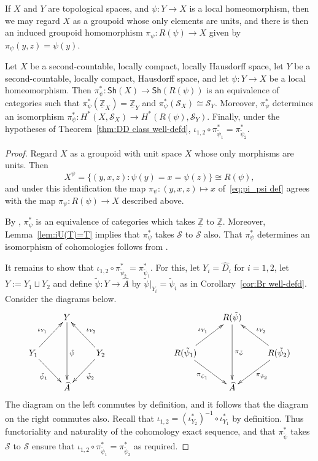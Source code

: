 \documentclass[12pt,a4paper]{amsart}
\newcommand{\field}[1]{\mathbb{#1}}
\newcommand{\ZZ}{\field{Z}}
\newcommand{\Sheaf}[1]{\mathsf{Sh}(#1)}
\newcommand{\Tgerms}{\mathcal{S}}
\begin{document}
If $X$ and $Y$ are topological spaces, and $\psi : Y \to X$ is
a local homeomorphism, then we may regard $X$ as a groupoid
whose only elements are units, and there is then an induced
groupoid homomorphism $\pi_\psi : R(\psi) \to X$ given by
$\pi_\psi(y,z) = \psi(y)$.


\begin{prop}\label{prp:Br(X)=H2(R(psi))}
Let $X$ be a second-countable, locally compact, locally
Hausdorff space, let $Y$ be a second-countable, locally compact,
Hausdorff space, and let $\psi : Y \to X$ be a local
homeomorphism. Then $\pi_\psi^* : \Sheaf{X} \to \Sheaf{R(\psi)}$
is an equivalence of categories such that
$\pi_\psi^*(\underline{\ZZ}_X) = \underline{\ZZ}_Y$ and
$\pi_\psi^*(\Tgerms_X) \cong \Tgerms_Y$. Moreover, $\pi_\psi^*$
determines an isomorphism $\pi_\psi^* : H^*(X, \Tgerms_X) \to
H^*(R(\psi),\Tgerms_Y)$. Finally, under the hypotheses of
Theorem~\ref{thm:DD class well-defd}, $\iota_{1,2} \circ
\pi_{\tilde{\psi}_1}^* = \pi_{\tilde{\psi}_2}^*$.
\end{prop}
\begin{proof}
Regard $X$ as a groupoid with unit space $X$ whose only
morphisms are units. Then
\[
X^\psi = \{(y,x,z) : \psi(y) = x = \psi(z)\} \cong R(\psi),
\]
and under this identification the map $\pi_\psi : (y,x,z)
\mapsto x$ of~\eqref{eq:pi_psi def} agrees with the map
$\pi_\psi : R(\psi) \to X$ described above.

By \cite[Proposition~0.8 and Theorem~0.9]{Kumjian1988},
$\pi_\psi^*$ is an equivalence of categories which takes
$\underline{\ZZ}$ to $\underline{\ZZ}$. Moreover,
Lemma~\ref{lem:iU(T)=T} implies that $\pi_\psi^*$ takes
$\Tgerms$ to $\Tgerms$ also. That $\pi_\psi^*$ determines an
isomorphism of cohomologies follows from
\cite[Proposition~1.8]{Kumjian1988}.

It remains to show that $\iota_{1,2} \circ
\pi_{\tilde{\psi}_2}^* = \pi_{\tilde{\psi}_1}^*$. For this, let
$Y_i = \widehat{D}_i$ for $i = 1,2$, let $Y := Y_1 \sqcup Y_2$
and define $\tilde{\psi} : Y \to \widehat{A}$ by
$\tilde{\psi}|_{Y_i} = \tilde{\psi}_i$ as in
Corollary~\ref{cor:Br well-defd}. Consider the diagrams below.
\[
\xymatrix{
& Y\ar[dd]^{\tilde{\psi}}& & & &R(\tilde{\psi}) \ar[dd]^{\pi_{\tilde{\psi}}}& \\
Y_1 \ar[ur]^{\iota_{Y_1}}\ar[dr]_{\tilde{\psi}_1} & & Y_2\ar[ul]_{\iota_{Y_2}}\ar[dl]^{\tilde{\psi}_2}
&\qquad&
    R(\tilde{\psi}_1) \ar[ur]^{\iota_{Y_1}}\ar[dr]_{\pi_{\tilde{\psi}_1}} & &R(\tilde{\psi}_2) \ar[ul]_{\iota_{Y_2}}\ar[dl]^{\pi_{\tilde{\psi}_2}} \\
& \widehat{A} & & & & \widehat{A} &}
\]
The diagram on the left commutes by definition, and it follows
that the diagram on the right commutes also. Recall that
$\iota_{1,2} = (\iota^*_{Y_2})^{-1} \circ \iota^*_{Y_1}$ by
definition. Thus functoriality and naturality of the cohomology
exact sequence, and that $\pi_{\tilde{\psi}}^*$ takes $\Tgerms$
to $\Tgerms$ ensure that $\iota_{1,2} \circ
\pi_{\tilde{\psi}_1}^* = \pi_{\tilde{\psi}_2}^*$ as required.
\end{proof}
\end{document}
